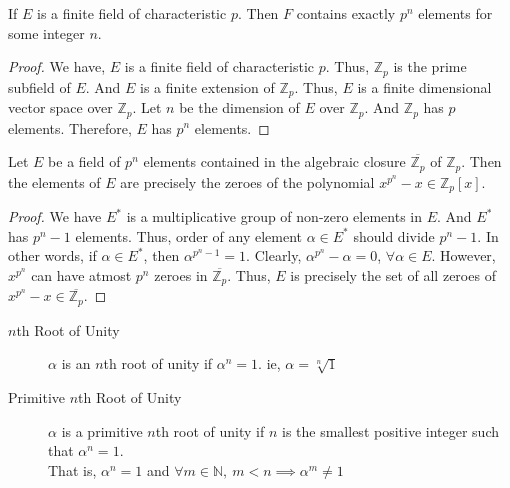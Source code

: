 \begin{corollary}
	If $E$ is a finite field of characteristic $p$.
	Then $F$ contains exactly $p^n$ elements for some integer $n$.
\end{corollary}
\begin{proof}
	We have, $E$ is a finite field of characteristic $p$.
	Thus, $\mathbb{Z}_p$ is the prime subfield of $E$.
	And $E$ is a finite extension of $\mathbb{Z}_p$.
	Thus, $E$ is a finite dimensional vector space over $\mathbb{Z}_p$.
	Let $n$ be the dimension of $E$ over $\mathbb{Z}_p$.
	And $\mathbb{Z}_p$ has $p$ elements.
	Therefore, $E$ has $p^n$ elements.
\end{proof}

\begin{theorem}
	Let $E$ be a field of $p^n$ elements contained in the algebraic closure $\overline{\mathbb{Z}_p}$ of $\mathbb{Z}_p$.
	Then the elements of $E$ are precisely the zeroes of the polynomial $x^{p^n}-x \in \mathbb{Z}_p[x]$.
\end{theorem}
\begin{proof}
	We have $E^\ast$ is a multiplicative group of non-zero elements in $E$.
	And $E^\ast$ has $p^n-1$ elements.
	Thus, order of any element $\alpha \in E^\ast$ should divide $p^n-1$.
	In other words, if $\alpha \in E^\ast$, then $\alpha^{p^n-1} = 1$.
	Clearly, $\alpha^{p^n} - \alpha = 0$, $\forall \alpha \in E$.
	However, $x^{p^n}$ can have atmost $p^n$ zeroes in $\overline{\mathbb{Z}_p}$.
	Thus, $E$ is precisely the set of all zeroes of $x^{p^n}-x \in \overline{\mathbb{Z}_p}$.
\end{proof}


\begin{description}
	\item[$n$th Root of Unity] $\alpha$ is an $n$th root of unity if $\alpha^n = 1$.
		ie, $\alpha = \sqrt[n]{1}$
	\item[Primitive $n$th Root of Unity] $\alpha$ is a primitive $n$th root of unity if $n$ is the smallest positive integer such that $\alpha^n = 1$.\\
		That is, $\alpha^n = 1$ and $\forall m \in \mathbb{N},\ m < n \implies \alpha^m \ne 1$
\end{description}

